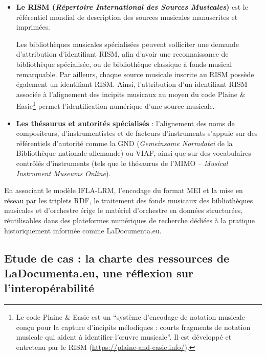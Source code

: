 \begin{itemize}
	\item \textbf{Le RISM (\textit{Répertoire International des Sources Musicales})} est le référentiel mondial de description des sources musicales manuscrites et imprimées.
	
	Les bibliothèques musicales spécialisées peuvent solliciter une demande d'attribution d'identifiant RISM, afin d'avoir une reconnaissance de bibliothèque spécialisée, ou de bibliothèque classique à fonds musical remarquable. Par ailleurs, chaque source musicale inscrite au RISM possède également un identifiant RISM. 
	Ainsi, l'attribution d'un identifiant RISM associée à l'alignement des incipits musicaux au moyen du code Plaine \& Easie\footnote{Le code Plaine \& Easie est un \enquote{système d'encodage de notation musicale conçu pour la capture d'incipits mélodiques : courts fragments de notation musicale qui aident à identifier l'œuvre musicale}. Il est développé et entretenu par le RISM (\url{https://plaine-and-easie.info/}).} permet l'identification numérique d'une source musicale.
 
	\item \textbf{Les thésaurus et autorités spécialisés }: l'alignement des noms de compositeurs, d'instrumentistes et de facteurs d'instruments s'appuie sur des référentiels d'autorité comme la GND (\textit{Gemeinsame Normdatei} de la Bibliothèque nationale allemande) ou VIAF, ainsi que sur des vocabulaires contrôlés d'instruments (tels que le thésaurus de l'MIMO -- \textit{Musical Instrument Museums Online}).
\end{itemize}

En associant le modèle IFLA-LRM, l'encodage du format MEI et la mise en réseau par les triplets RDF, le traitement des fonds musicaux des bibliothèques musicales et d'orchestre érige le matériel d'orchestre en données structurées, réutilisables dans des plateformes numériques de recherche dédiées à la pratique historiquement informée comme LaDocumenta.eu.


\subsection*{Etude de cas : la charte des ressources de LaDocumenta.eu, une réflexion sur l'interopérabilité}

